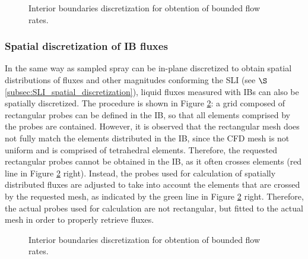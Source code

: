 \begin{figure}[ht]
     \centering
     \caption{Interior boundaries discretization for obtention of bounded flow rates.}
      \label{fig:jicf_IBs_sketch_calculation}
\end{figure}

\subsubsection*{Spatial discretization of IB fluxes}

In the same way as sampled spray can be in-plane discretized to obtain spatial distributions of fluxes and other magnitudes conforming the SLI (see $\S$\ref{subsec:SLI_spatial_discretization}), liquid fluxes measured with IBs can also be spatially discretized. The procedure is shown in Figure \ref{fig:jicf_IBs_sketch_discretization}: a grid composed of rectangular probes can be defined in the IB, so that all elements comprised by the probes are contained. However, it is observed that the rectangular mesh does not fully match the elements distributed in the IB, since the CFD mesh is not uniform and is comprised of tetrahedral elements. Therefore, the requested rectangular probes cannot be obtained in the IB, as it often crosses elements (red line in Figure \ref{fig:jicf_IBs_sketch_discretization} right). Instead, the probes used for calculation of spatially distributed fluxes are adjusted to take into account the elements that are crossed by the requested mesh, as indicated by the green line in Figure \ref{fig:jicf_IBs_sketch_discretization} right. Therefore, the actual probes used for calculation are not rectangular, but fitted to the actual mesh in order to properly retrieve fluxes.

\begin{figure}[ht]
     \centering
     \caption{Interior boundaries discretization for obtention of bounded flow rates.}
      \label{fig:jicf_IBs_sketch_discretization}
\end{figure}



